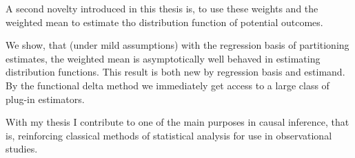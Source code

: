 A second novelty introduced in this thesis is,
to use these weights and the weighted mean to estimate tho distribution function of potential outcomes.

We show, that (under mild assumptions) with the regression basis of partitioning estimates, the weighted mean is asymptotically well behaved in estimating distribution functions.
This result is both new by regression basis and estimand.
By the functional delta method
\cite{Vaart2000} we immediately get access to a large class of plug-in estimators.

With my thesis I contribute to one of the main purposes in causal inference, that is, reinforcing classical methods of statistical analysis for use in observational studies.



%
%
%
%
%
%
%
%
%
